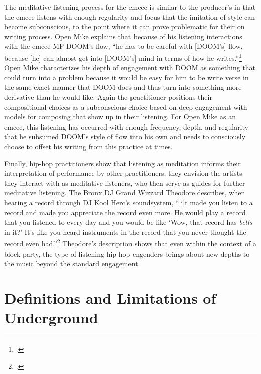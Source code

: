 The meditative listening process for the emcee is similar to the producer's in that the emcee
listens with enough regularity and focus that the imitation of style can become subconscious,
to the point where it can prove problematic for their on writing process. Open Mike explains
that because of his listening interactions with the emcee MF DOOM's flow, ``he has to be 
careful with [DOOM's] flow, because [he] can almost get into [DOOM's] mind in terms of how he 
writes.''\footnote{\cite{estellecaswellRappingDeconstructedBest2016}.} Open Mike characterizes
his depth of engagement with DOOM as something that could turn into a problem because it would
be easy for him to be write verse in the same exact manner that DOOM does and thus turn into
something more derivative than he would like. Again the practitioner positions their compositional
choices as a subconscious choice based on deep engagement with models for composing that show 
up in their listening. For Open Mike as an emcee, this listening has occurred with enough
frequency, depth, and regularity that he subsumed DOOM's style of flow into his own and needs
to consciously choose to offset his writing from this practice at times.

Finally, hip-hop practitioners show that listening as meditation informs their interpretation of
performance by other practitioners; they envision the artists they interact with as meditative
listeners, who then serve as guides for further meditative listening. The Bronx DJ Grand Wizzard
Theodore describes, when hearing a record through DJ Kool Herc's soundsystem, ``[i]t made you
listen to a record and made you appreciate the record even more. He would play a record that 
you listened to every day and you would be like `Wow, that record has \emph{bells} in it?' It's 
like you heard instruments in the record that you never thought the record even had.''\footnote{
\autocite[139]{christabronGlassHiphopProduction2015}.} Theodore's description shows that even
within the context of a block party, the type of listening hip-hop engenders brings about new
depths to the music beyond the standard engagement.

\section{Definitions and Limitations of Underground}

